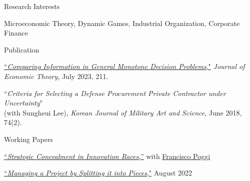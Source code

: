 \medskip



\begin{rSection}{Research Interests}
	
	Microeconomic Theory, 
	Dynamic Games, 
	Industrial Organization,
	Corporate Finance
	
\end{rSection}



\medskip


\begin{rSection}{Publication}
	
	\begin{etaremune}
		\item \href{https://yonggyun-yg-kim.github.io/files/Research%20papers/GMDP_JET.pdf}{``\textit{Comparing Information in General Monotone Decision Problems},"} 
		\textit{Journal of Economic Theory}, July 2023, 211. 
		
		\item 
		``\textit{Criteria for Selecting a Defense Procurement Private Contractor under Uncertainty}"\\
		(with Sungheui Lee), \textit{Korean Journal of Military Art and Science}, June 2018, 74(2). 
	\end{etaremune}
	
	
	
\end{rSection}

\begin{rSection}{Working Papers}
	
	\begin{etaremune}
		
		\item \href{https://yonggyun-yg-kim.github.io/files/Research%20papers/SCIR_public.pdf}{``\textit{Strategic Concealment in Innovation Races},''}   with \href{https://www.franciscopoggi.com/}{Francisco Poggi}
		
		\item \href{https://ssrn.com/abstract=3450802}{``\textit{Managing a Project by Splitting it into Pieces},"} August 2022	
		
	\end{etaremune}
	
	
\end{rSection}


